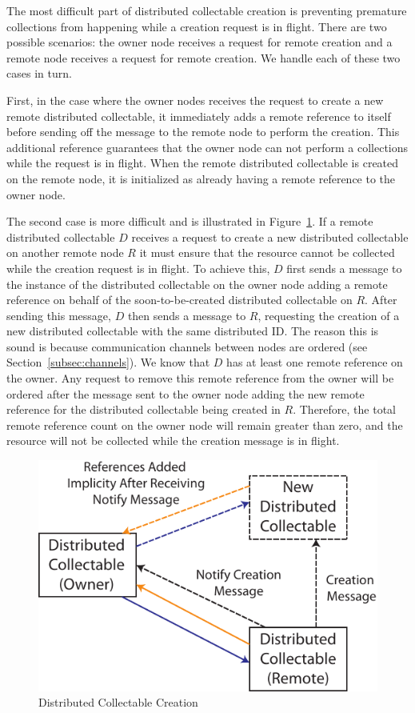 The most difficult part of distributed
collectable creation is preventing premature
collections from happening while a creation
request is in flight. There 
are two possible scenarios: the owner node receives 
a request for remote creation and a remote node 
receives a request for remote creation. We handle 
each of these two cases in turn.

First, in the case where the owner nodes receives
the request to create a new remote distributed
collectable, it immediately adds a remote reference
to itself before sending off the message to the
remote node to perform the creation.
This additional reference guarantees that the 
owner node can not perform a collections
while the request is in flight. When the remote
distributed collectable is created on the remote
node, it is initialized as already having a remote
reference to the owner node.

The second case is more difficult and is illustrated
in Figure~\ref{fig:distcreate}. If a remote
distributed collectable $D$ receives a request to 
create a new distributed collectable on another
remote node $R$ it must ensure that the resource cannot
be collected while the creation request is in flight.
To achieve this, $D$ first sends a message to the 
instance of the distributed collectable on the owner node 
adding a remote reference on behalf of the soon-to-be-created
distributed collectable on $R$. After sending this message,
$D$ then sends a message to $R$, requesting
the creation of a new distributed collectable with
the same distributed ID. The reason this is sound
is because communication
channels between nodes are ordered (see
Section~\ref{subsec:channels}). We know that $D$ has
at least one remote reference on the owner. Any
request to remove this remote reference from the
owner will be ordered after the message sent to the owner
node adding the new remote reference for the distributed 
collectable being created in $R$.  Therefore, the total 
remote reference count on the owner node will remain 
greater than zero, and the resource will not be collected 
while the creation message is in flight.

\begin{figure}
\centering
\includegraphics[scale=0.8]{figs/DistributedCollectableCreation.pdf}
\caption{Distributed Collectable Creation\label{fig:distcreate}}
\end{figure}

